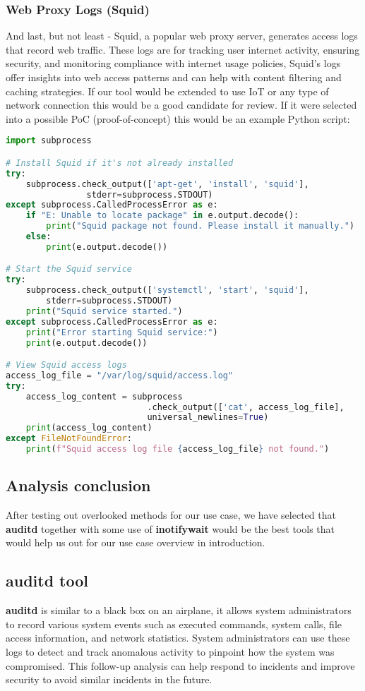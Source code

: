 \documentclass{VUMIFPSmagistrinis}
\begin{document}
\subsubsection{Web Proxy Logs (Squid)}
And last, but not least - Squid, a popular web proxy server, generates access logs that record web traffic. These logs are for tracking user internet activity, ensuring security, and monitoring compliance with internet usage policies, Squid's logs offer insights into web access patterns and can help with content filtering and caching strategies. If our tool would be extended to use IoT or any type of network connection this would be a good candidate for review. If it were selected into a possible PoC (proof-of-concept) this would be an example Python script:
\begin{lstlisting}[language=Python]
import subprocess

# Install Squid if it's not already installed
try:
    subprocess.check_output(['apt-get', 'install', 'squid'], 
                stderr=subprocess.STDOUT)
except subprocess.CalledProcessError as e:
    if "E: Unable to locate package" in e.output.decode():
        print("Squid package not found. Please install it manually.")
    else:
        print(e.output.decode())

# Start the Squid service
try:
    subprocess.check_output(['systemctl', 'start', 'squid'], 
        stderr=subprocess.STDOUT)
    print("Squid service started.")
except subprocess.CalledProcessError as e:
    print("Error starting Squid service:")
    print(e.output.decode())

# View Squid access logs
access_log_file = "/var/log/squid/access.log"
try:
    access_log_content = subprocess
                            .check_output(['cat', access_log_file], 
                            universal_newlines=True)
    print(access_log_content)
except FileNotFoundError:
    print(f"Squid access log file {access_log_file} not found.")
\end{lstlisting}

\subsection{Analysis conclusion}
After testing out overlooked methods for our use case, we have selected that \textbf{auditd} together with some use of \textbf{inotifywait} would be the best tools that would help us out for our use case overview in introduction.

\subsection{auditd tool}
\textbf{auditd} is similar to a black box on an airplane, it allows system administrators to record various system events such as executed commands, system calls, file access information, and network statistics. System administrators can use these logs to detect and track anomalous activity to pinpoint how the system was compromised. This follow-up analysis can help respond to incidents and improve security to avoid similar incidents in the future.
\end{document}
